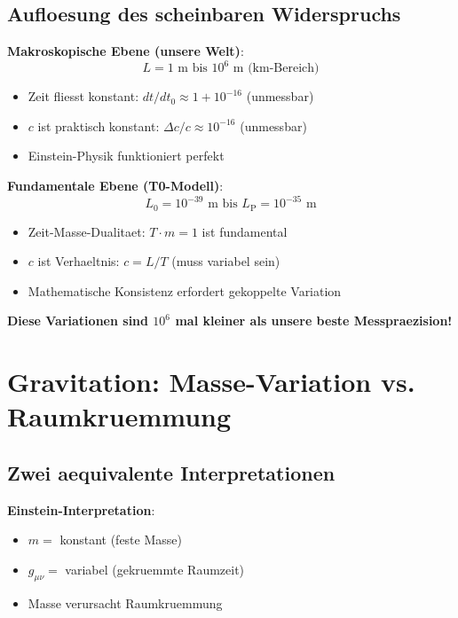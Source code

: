 \documentclass[12pt,a4paper]{article}
\newcommand{\Lzero}{L_0}
\newcommand{\Lp}{L_{\text{P}}}
\theoremstyle{definition}
\theoremstyle{remark}
\begin{document}
	\subsection{Aufloesung des scheinbaren Widerspruchs}
	
	\textbf{Makroskopische Ebene (unsere Welt)}:
	\begin{equation}
		L = 1 \text{ m bis } 10^6 \text{ m (km-Bereich)}
	\end{equation}
	
	\begin{itemize}
		\item Zeit fliesst konstant: $dt/dt_0 \approx 1 + 10^{-16}$ (unmessbar)
		\item $c$ ist praktisch konstant: $\Delta c/c \approx 10^{-16}$ (unmessbar)
		\item Einstein-Physik funktioniert perfekt
	\end{itemize}
	
	\textbf{Fundamentale Ebene (T0-Modell)}:
	\begin{equation}
		\Lzero = 10^{-39} \text{ m bis } \Lp = 10^{-35} \text{ m}
	\end{equation}
	
	\begin{itemize}
		\item Zeit-Masse-Dualitaet: $T \cdot m = 1$ ist fundamental
		\item $c$ ist Verhaeltnis: $c = L/T$ (muss variabel sein)
		\item Mathematische Konsistenz erfordert gekoppelte Variation
	\end{itemize}
	
	\textbf{Diese Variationen sind $10^6$ mal kleiner als unsere beste Messpraezision!}
	
	\section{Gravitation: Masse-Variation vs. Raumkruemmung}
	
	\subsection{Zwei aequivalente Interpretationen}
	
	\textbf{Einstein-Interpretation}:
	\begin{itemize}
		\item $m = $ konstant (feste Masse)
		\item $g_{\mu\nu} = $ variabel (gekruemmte Raumzeit)
		\item Masse verursacht Raumkruemmung
	\end{itemize}
	
\end{document}
